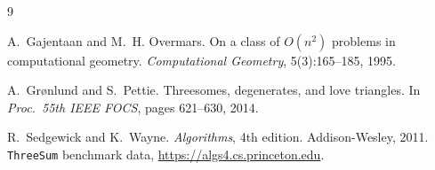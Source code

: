 \documentclass[11pt]{article}
\begin{document}
\begin{thebibliography}{9}

A.~Gajentaan and M.~H. Overmars.
\newblock On a class of $O(n^2)$ problems in computational geometry.
\newblock \emph{Computational Geometry}, 5(3):165--185, 1995.

A.~Gr{\o}nlund and S.~Pettie.
\newblock Threesomes, degenerates, and love triangles.
\newblock In \emph{Proc.\ 55th IEEE FOCS}, pages 621--630, 2014.

R.~Sedgewick and K.~Wayne.
\newblock \emph{Algorithms}, 4th edition.
\newblock Addison-Wesley, 2011. \texttt{ThreeSum} benchmark data,
  \url{https://algs4.cs.princeton.edu}.

\end{thebibliography}
\end{document}
